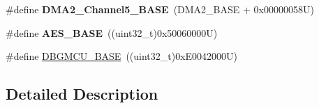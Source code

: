 \begin{DoxyCompactItemize}
\item 
\hypertarget{group___peripheral__memory__map_ga1eea983a5d68bf36f4d19fbb07955ca1}{\#define {\bfseries D\-M\-A2\-\_\-\-Channel5\-\_\-\-B\-A\-S\-E}~(D\-M\-A2\-\_\-\-B\-A\-S\-E + 0x00000058\-U)}\label{group___peripheral__memory__map_ga1eea983a5d68bf36f4d19fbb07955ca1}

\item 
\hypertarget{group___peripheral__memory__map_gad099ae8679538f6c00294639d67528bf}{\#define {\bfseries A\-E\-S\-\_\-\-B\-A\-S\-E}~((uint32\-\_\-t)0x50060000\-U)}\label{group___peripheral__memory__map_gad099ae8679538f6c00294639d67528bf}

\item 
\#define \hyperlink{group___peripheral__memory__map_ga4adaf4fd82ccc3a538f1f27a70cdbbef}{D\-B\-G\-M\-C\-U\-\_\-\-B\-A\-S\-E}~((uint32\-\_\-t)0x\-E0042000\-U)
\end{DoxyCompactItemize}


\subsection{Detailed Description}


